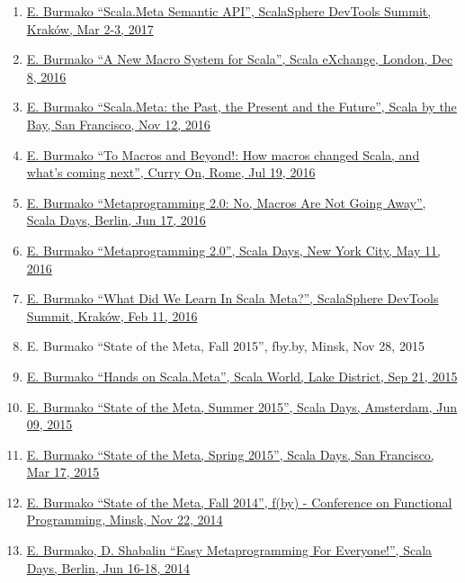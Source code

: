 \documentclass[margin, 10pt]{Stylesheet}
\begin{document}
\begin{resume}
\begin{enumerate}
\item \href{http://scalamacros.org/paperstalks/2017-03-02-ScalaSphere.pdf}{E. Burmako ``Scala.Meta Semantic API'', ScalaSphere DevTools Summit, Krak\'{o}w, Mar 2-3, 2017}
\item \href{http://scalamacros.org/paperstalks/2016-12-08-Scalax.pdf}{E. Burmako ``A New Macro System for Scala'', Scala eXchange, London, Dec 8, 2016}
\item \href{http://scalamacros.org/paperstalks/2016-11-12-ScalaByTheBay.pdf}{E. Burmako ``Scala.Meta: the Past, the Present and the Future'', Scala by the Bay, San Francisco, Nov 12, 2016}
\item \href{http://scalamacros.org/paperstalks/2016-07-19-ToMacrosAndBeyond.pdf}{E. Burmako ``To Macros and Beyond!: How macros changed Scala, and what's coming next'', Curry On, Rome, Jul 19, 2016}
\item \href{http://scalamacros.org/paperstalks/2016-06-17-Metaprogramming20.pdf}{E. Burmako ``Metaprogramming 2.0: No, Macros Are Not Going Away'', Scala Days, Berlin, Jun 17, 2016}
\item \href{http://scalamacros.org/paperstalks/2016-05-11-Metaprogramming20.pdf}{E. Burmako ``Metaprogramming 2.0'', Scala Days, New York City, May 11, 2016}
\item \href{http://scalamacros.org/paperstalks/2016-02-11-WhatDidWeLearnInScalaMeta.pdf}{E. Burmako ``What Did We Learn In Scala Meta?'', ScalaSphere DevTools Summit, Krak\'{o}w, Feb 11, 2016}
\item E. Burmako ``State of the Meta, Fall 2015'', fby.by, Minsk, Nov 28, 2015
\item \href{https://github.com/scalameta/tutorial}{E. Burmako ``Hands on Scala.Meta'', Scala World, Lake District, Sep 21, 2015}
\item \href{http://scalamacros.org/paperstalks/2015-06-09-StateOfTheMetaSummer2015.pdf}{E. Burmako ``State of the Meta, Summer 2015'', Scala Days, Amsterdam, Jun 09, 2015}
\item \href{http://scalamacros.org/paperstalks/2015-03-17-StateOfTheMetaSpring2015.pdf}{E. Burmako ``State of the Meta, Spring 2015'', Scala Days, San Francisco, Mar 17, 2015}
\item \href{http://scalamacros.org/paperstalks/2014-11-22-TheStateOfTheMeta.pdf}{E. Burmako ``State of the Meta, Fall 2014'', f(by) - Conference on Functional Programming, Minsk, Nov 22, 2014}
\item \href{http://scalamacros.org/paperstalks/2014-06-17-EasyMetaprogrammingForEveryone.pdf}{E. Burmako, D. Shabalin ``Easy Metaprogramming For Everyone!'', Scala Days, Berlin, Jun 16-18, 2014}

\end{enumerate}
\end{resume}
\end{document}

